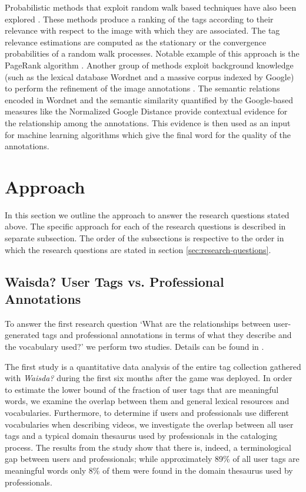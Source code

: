 Probabilistic methods that exploit random walk based techniques have also been explored \cite{Wang:2006:IAR:1180639.1180774,Liu:2009:TR:1526709.1526757,Li:2012:TRP:2382336.2382380}. These methods produce a ranking of the tags according to their relevance with respect to the image with which they are associated. The tag relevance estimations are computed as the stationary or the convergence probabilities of  a random walk processes. Notable example of this approach is the PageRank algorithm \cite{journals/corr/abs-1012-4872,10.4137/GRSB.S702,junker2008analysis}. Another group of methods exploit background knowledge (such as the lexical database Wordnet and a massive corpus indexed by Google) to perform the refinement of the image annotations \cite{Jin:2010:KBI:1731523.1731529,Wang:2007:RIA:1282280.1282343}. The semantic relations encoded in Wordnet and the semantic similarity quantified by the Google-based measures like the Normalized Google Distance \cite{DBLP:journals/corr/abs-cs-0412098} provide contextual evidence for the relationship among the annotations. This evidence is then used as an input for machine learning algorithms which give the final word for the quality of the annotations.

\section{Approach}
In this section we outline the approach to answer the research questions stated above. The specific approach for each of the research questions is described in separate subsection. The order of the subsections is respective to the order in which the research questions are stated in section \ref{sec:research-questions}.
\subsection{Waisda? User Tags vs. Professional Annotations}\label{sec:user-professional}
To answer the first research question `What are the relationships between user-generated tags  and professional annotations in terms of what they describe and the vocabulary used?' we perform two studies. Details can be found in \cite{websciencepaper,kcap}.

The first study is a quantitative data analysis of the entire tag collection gathered with \textit{Waisda?} during the first six months after the game was deployed. In order to estimate the lower bound of the fraction of user tags that are meaningful words, we examine the overlap between them and general lexical resources and vocabularies. Furthermore, to determine if users and professionals use different vocabularies when describing videos, we investigate the overlap between all user tags and a typical domain thesaurus used by professionals in the cataloging process. The results from the study show that there is, indeed, a terminological gap between users and professionals; while approximately 89\% of all user tags are meaningful words only 8\% of them were found in the domain thesaurus used by professionals.

